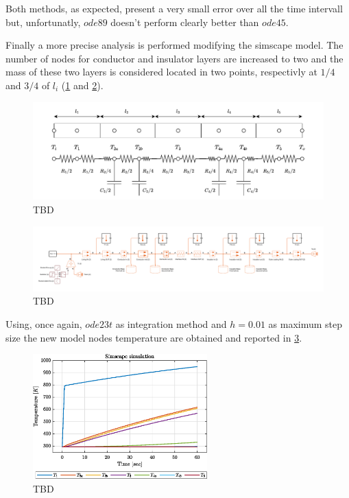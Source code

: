 \documentclass[11pt,a4paper,oneside]{article}
\begin{document}
Both methods, as expected, present a very small error over all the time intervall but, unfortunatly, $ode89$ doesn't perform clearly better than $ode45$.

Finally a more precise analysis is performed modifying the simscape model.
The number of nodes for conductor and insulator layers are increased to two and the mass of these two layers is considered located in two points, respectivly at $1/4$ and $3/4$ of $l_i$ (\cref{fig:phyModelCase2} and \cref{fig:ex1_simscapeCase2}).
\begin{figure}[htb]
    \centering
    \includegraphics*[width=1\textwidth, keepaspectratio]{Figures/ex1_phyModelCase2.pdf}
    \caption[]{\label{fig:phyModelCase2} TBD}
\end{figure}

\begin{figure}[htb]
    \centering
    \includegraphics*[width=1\textwidth, keepaspectratio]{Figures/ex1_simscapeCase2.pdf}
    \caption[]{\label{fig:ex1_simscapeCase2} TBD}
\end{figure}
\clearpage

Using, once again, $ode23t$ as integration method and $h=0.01$ as maximum step size the new model nodes temperature are obtained and reported in \cref{fig:ex1_tempCase2}.
\begin{figure}[htb]
    \centering
    \includegraphics*[width=0.6\textwidth, keepaspectratio]{Figures/ex1_tempCase2.eps}
    \caption[]{\label{fig:ex1_tempCase2} TBD}
\end{figure}
\end{document}
